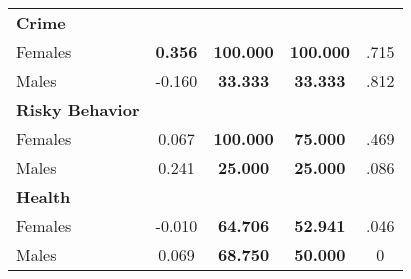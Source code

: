 \begin{tabular}{l c c c c}
\midrule
\textbf{Crime} & & & & \\
\quad Females &  \textbf{    0.356} & \textbf{  100.000} & \textbf{  100.000} & .715 \\
\quad Males &     -0.160 & \textbf{   33.333} & \textbf{   33.333} & .812 \\
\midrule
\textbf{Risky Behavior} & & & & \\
\quad Females &      0.067 & \textbf{  100.000} & \textbf{   75.000} & .469 \\
\quad Males &      0.241 & \textbf{   25.000} & \textbf{   25.000} & .086 \\
\midrule
\textbf{Health} & & & & \\
\quad Females &     -0.010 & \textbf{   64.706} & \textbf{   52.941} & .046 \\
\quad Males &      0.069 & \textbf{   68.750} & \textbf{   50.000} & 0 \\
\bottomrule
\end{tabular}
